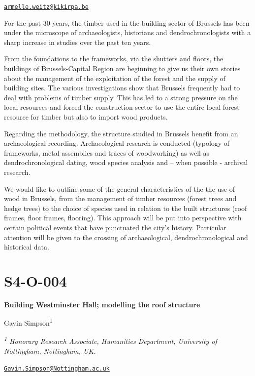 \documentclass[
]{book}
\begin{document}
\href{mailto:armelle.weitz@kikirpa.be}{\nolinkurl{armelle.weitz@kikirpa.be}}

For the past 30 years, the timber used in the building sector of Brussels has been under the microscope of archaeologists, historians and dendrochronologists with a sharp increase in studies over the past ten years.

From the foundations to the frameworks, via the shutters and floors, the buildings of Brussels-Capital Region are beginning to give us their own stories about the management of the exploitation of the forest and the supply of building sites. The various investigations show that Brussels frequently had to deal with problems of timber supply. This has led to a strong pressure on the local resources and forced the construction sector to use the entire local forest resource for timber but also to import wood products.

Regarding the methodology, the structure studied in Brussels benefit from an archaeological recording. Archaeological research is conducted (typology of frameworks, metal assemblies and traces of woodworking) as well as dendrochronological dating, wood species analysis and -- when possible - archival research.

We would like to outline some of the general characteristics of the the use of wood in Brussels, from the management of timber resources (forest trees and hedge trees) to the choice of species used in relation to the built structures (roof frames, floor frames, flooring). This approach will be put into perspective with certain political events that have punctuated the city's history. Particular attention will be given to the crossing of archaeological, dendrochronological and historical data.

\hypertarget{s4-o-004}{%
\section*{S4-O-004}\label{s4-o-004}}

\textbf{Building Westminster Hall; modelling the roof structure}

Gavin Simpson\textsuperscript{1}

\emph{\textsuperscript{1} Honorary Research Associate, Humanities Department, University of Nottingham, Nottingham, UK.}

\href{mailto:Gavin.Simpson@Nottingham.ac.uk}{\nolinkurl{Gavin.Simpson@Nottingham.ac.uk}}
\end{document}
